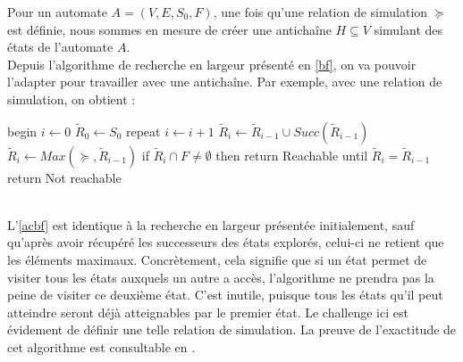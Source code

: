 \documentclass[12pt,a4paper,oneside]{book}
\theoremstyle{break}
\theoremstyle{breakplain}
\begin{document}
Pour un automate $A = (V,E,S_0,F)$, une fois qu'une relation de simulation $\succeq$ est définie, nous sommes en mesure de créer une antichaîne $H \subseteq V$ simulant des états de l'automate $A$.\\
Depuis l'algorithme de recherche en largeur présenté en \autoref{bf}, on va pouvoir l'adapter pour travailler avec une antichaîne. Par exemple, avec une relation de simulation, on obtient :

\begin{algorithm}[caption={Recherche en largeur améliorée \cite{geeraerts2013multiprocessor}},label={acbf},mathescape=true]
begin
   $i \leftarrow 0$
   $\widetilde{R}_0 \leftarrow S_0$
   repeat
       $i \leftarrow i+1$
       $\widetilde{R}_i \leftarrow \widetilde{R}_{i-1} \cup Succ(\widetilde{R}_{i-1})$
       $\widetilde{R}_i \leftarrow  Max(\succeq, \widetilde{R}_{i-1})$
       if $\widetilde{R}_i \cap F \neq \emptyset$ then return Reachable
   until $\widetilde{R}_i = \widetilde{R}_{i-1}$
   return Not reachable
\end{algorithm}
\phantom\\

L'\autoref{acbf} est identique à la recherche en largeur présentée initialement, sauf qu'après avoir récupéré les successeurs des états explorés, celui-ci ne retient que les éléments maximaux. Concrètement, cela signifie que si un état permet de visiter tous les états auxquels un autre a accès, l'algorithme ne prendra pas la peine de visiter ce deuxième état. C'est inutile, puisque tous les états qu'il peut atteindre seront déjà atteignables par le premier état. Le challenge ici est évidement de définir une telle relation de simulation. La preuve de l'exactitude de cet algorithme est consultable en \cite{geeraerts2013multiprocessor}.\\

\pagebreak
\end{document}
